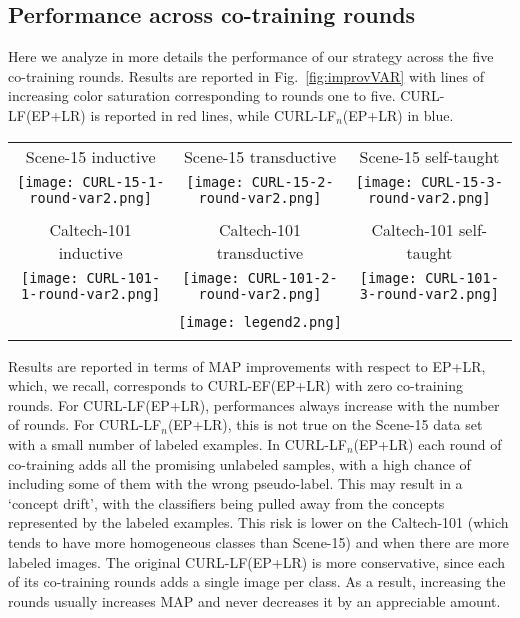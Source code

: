 \documentclass[journal,11pt]{IEEEtran}
\newcommand{\ADD}[1]{#1}
\newcommand{\coso}{strategy}
\newcommand{\curlef}{CURL-EF(EP+LR)}
\newcommand{\curllf}{CURL-LF(EP+LR)}
\newcommand{\curllfn}{CURL-LF$_n$(EP+LR)}
\begin{document}
\subsection{Performance across co-training rounds}
\label{subsec:rounds}
Here we analyze \ADD{in more details} the performance of our \coso{ }across the five
co-training rounds. Results are reported in Fig.~\ref{fig:improvVAR} with lines of increasing color saturation corresponding to rounds one to five. \curllf{ }is reported in red lines, while \curllfn{ }in blue.
\begin{figure*}[!htbp]%
\centering
\renewcommand{\tabcolsep}{0cm}
\scriptsize
\begin{tabular}{ccc}
Scene-15 inductive & Scene-15 transductive & Scene-15 self-taught\\
\texttt{[image: CURL-15-1-round-var2.png]} &
\texttt{[image: CURL-15-2-round-var2.png]} &
\texttt{[image: CURL-15-3-round-var2.png]} \\
\\
Caltech-101 inductive & Caltech-101 transductive & Caltech-101 self-taught\\
\texttt{[image: CURL-101-1-round-var2.png]} &
\texttt{[image: CURL-101-2-round-var2.png]} &
\texttt{[image: CURL-101-3-round-var2.png]} \\
\\
\multicolumn{3}{c}{\texttt{[image: legend2.png]}} \\
\\
\end{tabular}
\caption{Performance obtained by \curllf{ }and \curllfn{ }varying the
  number of co-training rounds.  %
  Performance are reported in terms of MAP improvement
  with respect to Ensemble Projection.  Due to the small cardinality
  of some classes, inductive learning on the Caltech-101 has been
  limited to five labeled images per class.}
\label{fig:improvVAR}
\end{figure*}
Results are reported in terms of MAP
improvements with respect to EP\ADD{+LR}, which, we recall, corresponds to
\curlef{ }with zero co-training rounds. For \curllf, performances always
increase with the number of rounds. For \curllfn, this is not true on
the Scene-15 data set with a small number of labeled examples.  In
\curllfn{ }each round of co-training adds all the promising unlabeled
samples, with a high chance of including some of them with the wrong
pseudo-label. This may result in a `concept drift', with the
classifiers being pulled away from the concepts represented by the
labeled examples.  This risk is lower on the Caltech-101 (which tends
to have more homogeneous classes than Scene-15) and when there are
more labeled images. The original \curllf{ }is more conservative, since
each of its co-training rounds adds a single image per class.  As a
result, increasing the rounds usually increases MAP and never decreases it by an
appreciable amount.
\end{document}
